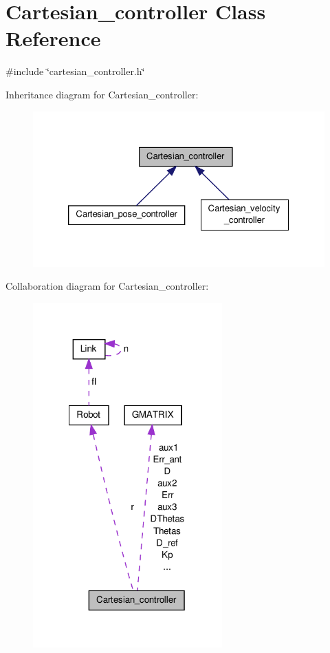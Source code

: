 \hypertarget{classCartesian__controller}{\section{Cartesian\-\_\-controller Class Reference}
\label{classCartesian__controller}
}


{\ttfamily \#include \char`\"{}cartesian\-\_\-controller.\-h\char`\"{}}



Inheritance diagram for Cartesian\-\_\-controller\-:\nopagebreak
\begin{figure}[H]
\begin{center}
\leavevmode
\includegraphics[width=326pt]{classCartesian__controller__inherit__graph}
\end{center}
\end{figure}


Collaboration diagram for Cartesian\-\_\-controller\-:\nopagebreak
\begin{figure}[H]
\begin{center}
\leavevmode
\includegraphics[width=206pt]{classCartesian__controller__coll__graph}
\end{center}
\end{figure}
